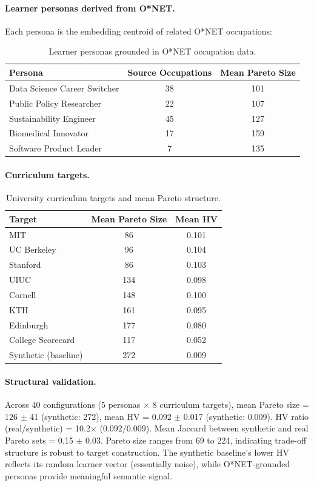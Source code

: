 \documentclass[sigconf,review]{acmart}
\begin{document}
\paragraph{Learner personas derived from O*NET.}
Each persona is the embedding centroid of related O*NET occupations:
\begin{table}[htbp]
\centering
\small
\caption{Learner personas grounded in O*NET occupation data.}
\label{tab:real-learner-personas}
\begin{tabular}{lcc}
\toprule
Persona & Source Occupations & Mean Pareto Size \\
\midrule
Data Science Career Switcher & 38 & 101 \\
Public Policy Researcher & 22 & 107 \\
Sustainability Engineer & 45 & 127 \\
Biomedical Innovator & 17 & 159 \\
Software Product Leader & 7 & 135 \\
\bottomrule
\end{tabular}
\end{table}

\paragraph{Curriculum targets.}
\begin{table}[htbp]
\centering
\small
\caption{University curriculum targets and mean Pareto structure.}
\label{tab:real-university-targets}
\begin{tabular}{lcc}
\toprule
Target & Mean Pareto Size & Mean HV \\
\midrule
MIT & 86 & 0.101 \\
UC Berkeley & 96 & 0.104 \\
Stanford & 86 & 0.103 \\
UIUC & 134 & 0.098 \\
Cornell & 148 & 0.100 \\
KTH & 161 & 0.095 \\
Edinburgh & 177 & 0.080 \\
College Scorecard & 117 & 0.052 \\
\midrule
Synthetic (baseline) & 272 & 0.009 \\
\bottomrule
\end{tabular}
\end{table}

\paragraph{Structural validation.}
Across 40 configurations (5 personas $\times$ 8 curriculum targets), mean Pareto size = 126 $\pm$ 41 (synthetic: 272), mean HV = 0.092 $\pm$ 0.017 (synthetic: 0.009). HV ratio (real/synthetic) = 10.2$\times$ ($0.092/0.009$). Mean Jaccard between synthetic and real Pareto sets = 0.15 $\pm$ 0.03. Pareto size ranges from 69 to 224, indicating trade-off structure is robust to target construction. The synthetic baseline's lower HV reflects its random learner vector (essentially noise), while O*NET-grounded personas provide meaningful semantic signal.
\end{document}
